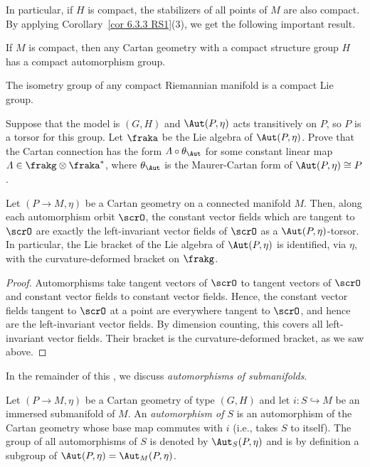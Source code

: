 In particular, if $H$ is compact, the stabilizers of all points of $M$ are also compact. By applying Corollary~\ref{cor 6.3.3 RS1}(3), we get the following important result.

\begin{cor}
    If $M$ is compact, then any Cartan geometry with a compact structure group $H$ has a compact automorphism group.
\end{cor}

\begin{cor}\label{cor compact isometry group}
    The isometry group of any compact Riemannian manifold is a compact Lie group.
\end{cor}

\begin{xca}
    Suppose that the model is $(G,H)$ and $\Aut(P,\eta)$ acts transitively on $P$, so $P$ is a torsor for this group. Let $\fraka$ be the Lie algebra of $\Aut(P,\eta)$. Prove that the Cartan connection has the form $\varLambda\circ\theta_{\Aut}$ for some constant linear map $\varLambda\in\frakg\otimes\fraka^\ast$, where $\theta_{\Aut}$ is the Maurer-Cartan form of $\Aut(P,\eta)\cong P$.
\end{xca}


\begin{cor}
    Let $(P\to M,\eta)$ be a Cartan geometry on a connected manifold $M$. Then, along each automorphism orbit $\scrO$, the constant vector fields which are tangent to $\scrO$ are exactly the left-invariant vector fields of $\scrO$ as a $\Aut(P,\eta)$-torsor. In particular, the Lie bracket of the Lie algebra of $\Aut(P,\eta)$ is identified, via $\eta$, with the curvature-deformed bracket on $\frakg$.
\end{cor}
\begin{proof}
    Automorphisms take tangent vectors of $\scrO$ to tangent vectors of $\scrO$ and constant vector fields to constant vector fields. Hence, the constant vector fields tangent to $\scrO$ at a point are everywhere tangent to $\scrO$, and hence are the left-invariant vector fields. By dimension counting, this covers all left-invariant vector fields. Their bracket is the curvature-deformed bracket, as we saw above.
\end{proof}


In the remainder of this \sect, we discuss \emph{automorphisms of submanifolds}.


\begin{defn}
    Let $(P\to M,\eta)$ be a Cartan geometry of type $(G,H)$ and let $i:S\hookrightarrow M$ be an immersed submanifold of $M$. An \emph{automorphism of $S$} is an automorphism of the Cartan geometry whose base map commutes with $i$ (i.e., takes $S$ to itself). The group of all automorphisms of $S$ is denoted by $\Aut_S(P,\eta)$ and is by definition a subgroup of $\Aut(P,\eta)=\Aut_M(P,\eta)$.
\end{defn}


